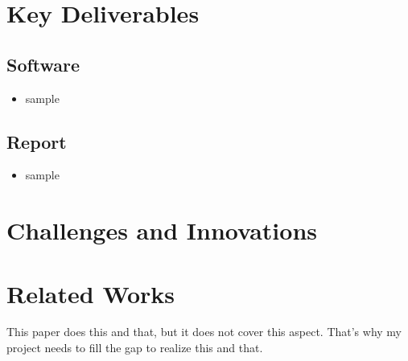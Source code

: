 \documentclass[11pt,onecolumn]{article}
\theoremstyle{definition}
\begin{document}
\section{Key Deliverables}
\subsection{Software}
\begin{itemize}
  \item sample
\end{itemize}


\subsection{Report}
\begin{itemize}
  \item sample
\end{itemize}



\section{Challenges and Innovations}


\section{Related Works}

This paper \cite{9868090} does this and that, but it does not cover this aspect. That's why my project needs to fill the gap to realize this and that.



\end{document}
